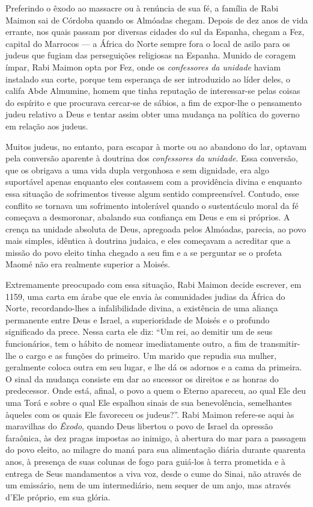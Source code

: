 Preferindo o êxodo ao massacre ou à renúncia de sua fé, a família de
Rabi Maimon sai de Córdoba quando os Almóadas chegam. Depois de dez
anos de vida errante, nos quais passam por diversas cidades do sul da
Espanha, chegam a Fez, capital do Marrocos --- a África do Norte
sempre fora o local de asilo para os judeus que fugiam das perseguições
religiosas na Espanha. Munido de coragem ímpar, Rabi Maimon opta por
Fez, onde os \emph{confessores da unidade} haviam instalado sua corte,
porque tem esperança de ser introduzido ao líder deles, o califa
Abde Almumine, homem que tinha reputação de interessar-se pelas coisas 
do espírito e que procurava cercar-se de sábios, a fim de expor-lhe o 
pensamento judeu relativo a Deus e tentar assim obter uma mudança na 
política do governo em relação aos judeus.

Muitos judeus, no entanto, para escapar à morte ou ao abandono do lar,
optavam pela conversão aparente à doutrina dos \emph{confessores da
unidade}. Essa conversão, que os obrigava a uma vida dupla vergonhosa
e sem dignidade, era algo suportável apenas enquanto eles contassem com
a providência divina e enquanto essa situação de sofrimentos tivesse
algum sentido compreensível. Contudo, esse conflito se tornava um
sofrimento intolerável quando o sustentáculo moral da fé começava a
desmoronar, abalando sua confiança em Deus e em si próprios. A crença na
unidade absoluta de Deus, apregoada pelos Almóadas, parecia, ao povo
mais simples, idêntica à doutrina judaica, e eles começavam a acreditar
que a missão do povo eleito tinha chegado a seu fim e a se perguntar se
o profeta Maomé não era realmente superior a Moisés.

Extremamente preocupado com essa situação, Rabi Maimon decide escrever,
em 1159, uma carta em árabe que ele envia às comunidades judias da
África do Norte, recordando-lhes a infalibilidade divina, a existência
de uma aliança permanente entre Deus e Israel, a superioridade de Moisés
e o profundo significado da prece. Nessa carta ele diz: ``Um rei, ao
demitir um de seus funcionários, tem o hábito de nomear imediatamente
outro, a fim de transmitir-lhe o cargo e as funções do primeiro. Um
marido que repudia sua mulher, geralmente coloca outra em seu lugar, e
lhe dá os adornos e a cama da primeira. O sinal da mudança consiste em
dar ao sucessor os direitos e as honras do predecessor. Onde está,
afinal, o povo a quem o Eterno apareceu, ao qual Ele deu uma
Torá e sobre o qual Ele espalhou sinais de sua benevolência,
semelhantes àqueles com os quais Ele favoreceu os judeus?''. Rabi
Maimon refere-se aqui às maravilhas do \emph{Êxodo}, quando Deus libertou o
povo de Israel da opressão faraônica, às dez pragas impostas ao inimigo,
à abertura do mar para a passagem do povo eleito, ao milagre do maná
para sua alimentação diária durante quarenta anos, à presença de suas
colunas de fogo para guiá-los à terra prometida e à entrega de Seus
mandamentos a viva voz, desde o cume do Sinai, não através de um
emissário, nem de um intermediário, nem sequer de um anjo, mas através
d'Ele próprio, em sua glória. 

